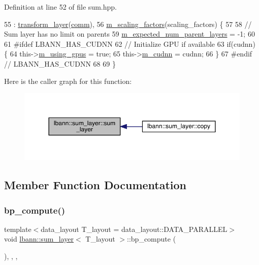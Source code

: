 Definition at line 52 of file sum.\+hpp.


\begin{DoxyCode}
55     : \hyperlink{classlbann_1_1transform__layer_a4b72501e0f4d0745c8b13c5331055e65}{transform\_layer}(\hyperlink{file__io_8cpp_ab048c6f9fcbcfaa57ce68b00263dbebe}{comm}),
56       \hyperlink{classlbann_1_1sum__layer_a371ae9038d8654fbca134e0f61e1e29a}{m\_scaling\_factors}(scaling\_factors) \{
57 
58     \textcolor{comment}{// Sum layer has no limit on parents}
59     \hyperlink{classlbann_1_1Layer_a841b96b25555247f52921c7f13ae1dfa}{m\_expected\_num\_parent\_layers} = -1;
60 
61 \textcolor{preprocessor}{  #ifdef LBANN\_HAS\_CUDNN}
62     \textcolor{comment}{// Initialize GPU if available}
63     \textcolor{keywordflow}{if}(cudnn) \{
64       this->\hyperlink{classlbann_1_1Layer_af7881cb5eff5207c15fa835d65462e8f}{m\_using\_gpus} = \textcolor{keyword}{true};
65       this->\hyperlink{classlbann_1_1Layer_a08dbb94239e3b8c96329786c57c72e21}{m\_cudnn} = cudnn;
66     \}
67 \textcolor{preprocessor}{  #endif // LBANN\_HAS\_CUDNN}
68 
69   \}
\end{DoxyCode}
Here is the caller graph for this function\+:\nopagebreak
\begin{figure}[H]
\begin{center}
\leavevmode
\includegraphics[width=350pt]{classlbann_1_1sum__layer_a00dfb715bda89ac6aaa10f045c9a49a5_icgraph}
\end{center}
\end{figure}


\subsection{Member Function Documentation}
\mbox{\label{classlbann_1_1sum__layer_a0dcddd056cf81c1fbea22a5e1c01c6d9}} 
\subsubsection{\texorpdfstring{bp\+\_\+compute()}{bp\_compute()}}
{\footnotesize\ttfamily template$<$data\+\_\+layout T\+\_\+layout = data\+\_\+layout\+::\+D\+A\+T\+A\+\_\+\+P\+A\+R\+A\+L\+L\+EL$>$ \\
void \hyperlink{classlbann_1_1sum__layer}{lbann\+::sum\+\_\+layer}$<$ T\+\_\+layout $>$\+::bp\+\_\+compute (\begin{DoxyParamCaption}{ }\end{DoxyParamCaption})\hspace{0.3cm}{\ttfamily [inline]}, {\ttfamily [override]}, {\ttfamily [protected]}, {\ttfamily [virtual]}}

